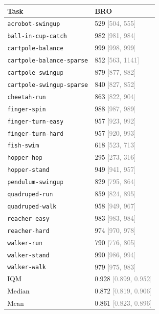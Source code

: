 \begin{tabular}{ll}
\toprule
Task & BRO \\
\midrule
\texttt{acrobot-swingup} & 529 \textcolor{gray}{[504, 555]} \\
\texttt{ball-in-cup-catch} & 982 \textcolor{gray}{[981, 984]} \\
\texttt{cartpole-balance} & 999 \textcolor{gray}{[998, 999]} \\
\texttt{cartpole-balance-sparse} & 852 \textcolor{gray}{[563, 1141]} \\
\texttt{cartpole-swingup} & 879 \textcolor{gray}{[877, 882]} \\
\texttt{cartpole-swingup-sparse} & 840 \textcolor{gray}{[827, 852]} \\
\texttt{cheetah-run} & 863 \textcolor{gray}{[822, 904]} \\
\texttt{finger-spin} & 988 \textcolor{gray}{[987, 989]} \\
\texttt{finger-turn-easy} & 957 \textcolor{gray}{[923, 992]} \\
\texttt{finger-turn-hard} & 957 \textcolor{gray}{[920, 993]} \\
\texttt{fish-swim} & 618 \textcolor{gray}{[523, 713]} \\
\texttt{hopper-hop} & 295 \textcolor{gray}{[273, 316]} \\
\texttt{hopper-stand} & 949 \textcolor{gray}{[941, 957]} \\
\texttt{pendulum-swingup} & 829 \textcolor{gray}{[795, 864]} \\
\texttt{quadruped-run} & 859 \textcolor{gray}{[824, 895]} \\
\texttt{quadruped-walk} & 958 \textcolor{gray}{[949, 967]} \\
\texttt{reacher-easy} & 983 \textcolor{gray}{[983, 984]} \\
\texttt{reacher-hard} & 974 \textcolor{gray}{[970, 978]} \\
\texttt{walker-run} & 790 \textcolor{gray}{[776, 805]} \\
\texttt{walker-stand} & 990 \textcolor{gray}{[986, 994]} \\
\texttt{walker-walk} & 979 \textcolor{gray}{[975, 983]} \\
IQM & 0.928 \textcolor{gray}{[0.899, 0.952]} \\
Median & 0.872 \textcolor{gray}{[0.819, 0.906]} \\
Mean & 0.861 \textcolor{gray}{[0.823, 0.896]} \\
\bottomrule
\end{tabular}
